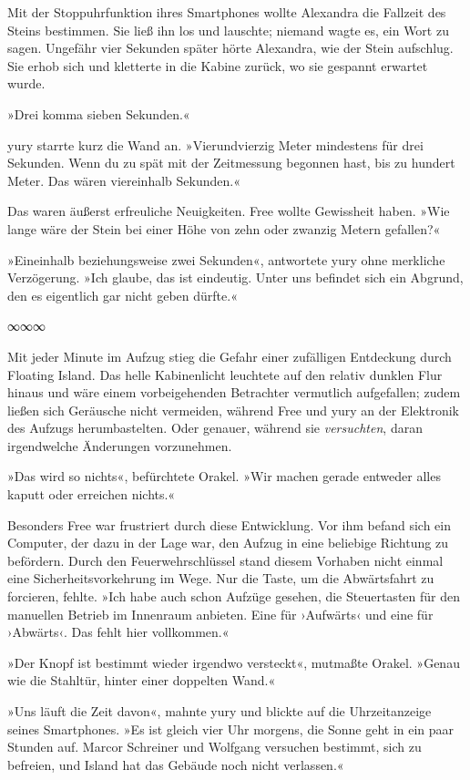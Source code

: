 Mit der Stoppuhrfunktion ihres Smartphones wollte Alexandra die Fallzeit des Steins bestimmen. Sie ließ ihn los und lauschte; niemand wagte es, ein Wort zu sagen. Ungefähr vier Sekunden später hörte Alexandra, wie der Stein aufschlug. Sie erhob sich und kletterte in die Kabine zurück, wo sie gespannt erwartet wurde.

»Drei komma sieben Sekunden.«

yury starrte kurz die Wand an. »Vierundvierzig Meter mindestens für drei Sekunden. Wenn du zu spät mit der Zeitmessung begonnen hast, bis zu hundert Meter. Das wären viereinhalb Sekunden.«

Das waren äußerst erfreuliche Neuigkeiten. Free wollte Gewissheit haben. »Wie lange wäre der Stein bei einer Höhe von zehn oder zwanzig Metern gefallen?«

»Eineinhalb beziehungsweise zwei Sekunden«, antwortete yury ohne merkliche Verzögerung. »Ich glaube, das ist eindeutig. Unter uns befindet sich ein Abgrund, den es eigentlich gar nicht geben dürfte.«

\begin{center}
	∞∞∞
\end{center}

Mit jeder Minute im Aufzug stieg die Gefahr einer zufälligen Entdeckung durch Floating Island. Das helle Kabinenlicht leuchtete auf den relativ dunklen Flur hinaus und wäre einem vorbeigehenden Betrachter vermutlich aufgefallen; zudem ließen sich Geräusche nicht vermeiden, während Free und yury an der Elektronik des Aufzugs herumbastelten. Oder genauer, während sie \emph{versuchten}, daran irgendwelche Änderungen vorzunehmen.

»Das wird so nichts«, befürchtete Orakel. »Wir machen gerade entweder alles kaputt oder erreichen nichts.«

Besonders Free war frustriert durch diese Entwicklung. Vor ihm befand sich ein Computer, der dazu in der Lage war, den Aufzug in eine beliebige Richtung zu befördern. Durch den Feuerwehrschlüssel stand diesem Vorhaben nicht einmal eine Sicherheitsvorkehrung im Wege. Nur die Taste, um die Abwärtsfahrt zu forcieren, fehlte. »Ich habe auch schon Aufzüge gesehen, die Steuertasten für den manuellen Betrieb im Innenraum anbieten. Eine für ›Aufwärts‹ und eine für ›Abwärts‹. Das fehlt hier vollkommen.«

»Der Knopf ist bestimmt wieder irgendwo versteckt«, mutmaßte Orakel. »Genau wie die Stahltür, hinter einer doppelten Wand.«

»Uns läuft die Zeit davon«, mahnte yury und blickte auf die Uhrzeitanzeige seines Smartphones. »Es ist gleich vier Uhr morgens, die Sonne geht in ein paar Stunden auf. Marcor Schreiner und Wolfgang versuchen bestimmt, sich zu befreien, und Island hat das Gebäude noch nicht verlassen.«

